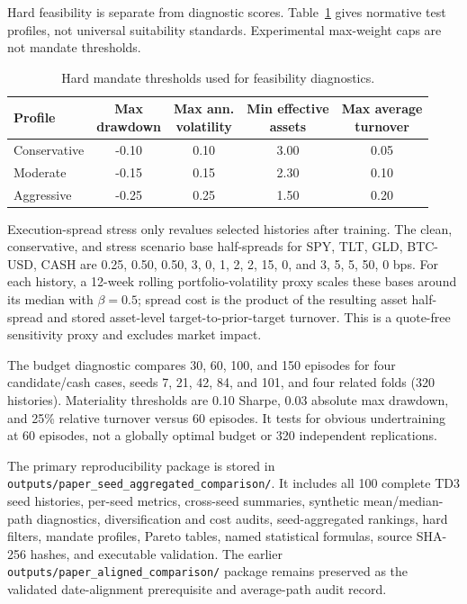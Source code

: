 \documentclass[11pt]{article}
\begin{document}
Hard feasibility is separate from diagnostic scores. Table~\ref{tab:mandate-thresholds} gives normative test profiles, not universal suitability standards. Experimental max-weight caps are not mandate thresholds.

\begin{table}[H]
\centering
\caption{Hard mandate thresholds used for feasibility diagnostics.}
\label{tab:mandate-thresholds}
\footnotesize
\begin{tabular}{@{}lcccc@{}}
\toprule
Profile & \makecell{Max\\drawdown} & \makecell{Max ann.\\volatility} & \makecell{Min effective\\assets} & \makecell{Max average\\turnover} \\
\midrule
Conservative & -0.10 & 0.10 & 3.00 & 0.05 \\
Moderate & -0.15 & 0.15 & 2.30 & 0.10 \\
Aggressive & -0.25 & 0.25 & 1.50 & 0.20 \\
\bottomrule
\end{tabular}
\end{table}

Execution-spread stress only revalues selected histories after training. The clean, conservative, and stress scenario base half-spreads for {SPY, TLT, GLD, BTC-USD, CASH} are {0.25, 0.50, 0.50, 3, 0}, {1, 2, 2, 15, 0}, and {3, 5, 5, 50, 0} bps. For each history, a 12-week rolling portfolio-volatility proxy scales these bases around its median with $\beta=0.5$; spread cost is the product of the resulting asset half-spread and stored asset-level target-to-prior-target turnover. This is a quote-free sensitivity proxy and excludes market impact.

The budget diagnostic compares 30, 60, 100, and 150 episodes for four candidate/cash cases, seeds 7, 21, 42, 84, and 101, and four related folds (320 histories). Materiality thresholds are 0.10 Sharpe, 0.03 absolute max drawdown, and 25\% relative turnover versus 60 episodes. It tests for obvious undertraining at 60 episodes, not a globally optimal budget or 320 independent replications.

The primary reproducibility package is stored in \texttt{outputs/paper\_seed\_aggregated\_comparison/}. It includes all 100 complete TD3 seed histories, per-seed metrics, cross-seed summaries, synthetic mean/median-path diagnostics, diversification and cost audits, seed-aggregated rankings, hard filters, mandate profiles, Pareto tables, named statistical formulas, source SHA-256 hashes, and executable validation. The earlier \texttt{outputs/paper\_aligned\_comparison/} package remains preserved as the validated date-alignment prerequisite and average-path audit record.
\end{document}

